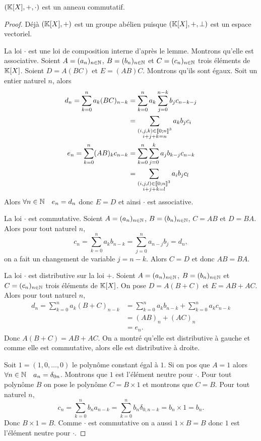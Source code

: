 \begin{theo}
  $(\mathbb{K}[X],+,\cdot)$ est un anneau commutatif.
\end{theo}
\begin{proof}
  Déjà $(\mathbb{K}[X],+)$ est un groupe abélien puisque $(\mathbb{K}[X],+,\perp)$ est un espace vectoriel.

  La loi $\cdot$ est une loi de composition interne d'après le lemme. Montrons qu'elle est associative. Soient $A=(a_n)_{n \in \mathbb{N}}$, $B=(b_n)_{n \in \mathbb{N}}$ et $C=(c_n)_{n \in \mathbb{N}}$ trois éléments de $\mathbb{K}[X]$. Soient $D=A(BC)$ et $E=(AB)C$. Montrons qu'ils sont égaux. Soit un entier naturel $n$, alors
  \begin{align}
    d_n = \sum_{k=0}^n a_k (BC)_{n-k} &= \sum_{k=0}^n a_k \sum_{j=0}^{n-k} b_j c_{n-k-j} \\
    &=\sum_{\substack{(i,j,k)\in \mathopen{\llbracket}0\mathclose{}\mathpunct{};n\mathclose{\rrbracket}^3 \\  i+j+k=n}} a_k b_j c_i \\
    e_n = \sum_{k=0}^n (AB)_k c_{n-k} &= \sum_{k=0}^n \sum_{j=0}^{k} a_j  b_{k-j} c_{n-k} \\
    &=\sum_{\substack{(i,j,l)\in \mathopen{\llbracket}0\mathclose{}\mathpunct{};n\mathclose{\rrbracket}^3 \\  i+j+k=l}} a_i b_j c_l \\
  \end{align}
  Alors $\forall n \in \mathbb{N} \quad e_n=d_n$ donc $E=D$ et ainsi $\cdot$ est associative.

  La loi $\cdot$ est commutative. Soient $A=(a_n)_{n \in \mathbb{N}}$, $B=(b_n)_{n \in \mathbb{N}}$, $C=AB$ et $D=BA$. Alors pour tout naturel $n$,
  \begin{equation}
    c_n = \sum_{k=0}^n a_k b_{n-k} = \sum_{j=0}^n a_{n-j} b_{j} =d_n,
  \end{equation}
  on a fait un changement de variable $j=n-k$. Alors $C=D$ et donc $AB=BA$.

  La loi $\cdot$ est distributive sur la loi $+$. Soient $A=(a_n)_{n \in \mathbb{N}}$, $B=(b_n)_{n \in \mathbb{N}}$ et $C=(c_n)_{n \in \mathbb{N}}$ trois éléments de $\mathbb{K}[X]$. On pose $D=A(B+C)$ et $E=AB+AC$. Alors pour tout naturel $n$,
  \begin{align}
    d_n = \sum_{k=0}^n a_k(B+C)_{n-k} &= \sum_{k=0}^n a_k b_{n-k} + \sum_{k=0}^n a_k c_{n-k} \\
    &=(AB)_n +(AC)_n \\
    &=e_n.
  \end{align}
  Donc $A(B+C)=AB+AC$. On a montré qu'elle est distributive à gauche et comme elle est commutative, alors elle est distributive à droite.

  Soit $1=(1,0, \ldots, 0)$ le polynôme constant égal à $1$. Si on pos que $A=1$ alors $\forall n \in \mathbb{N} \quad a_n = \delta_{0n}$. Montrons que $1$ est l'élément neutre pour $\cdot$. Pour tout polynôme $B$ on pose le polynôme $C=B \times 1$ et montrons que $C=B$. Pour tout naturel $n$,
  \begin{equation}
    c_n = \sum_{k=0}^n b_{n} a_{n-k} = \sum_{k=0}^n b_{n} \delta_{0,n-k} = b_n \times 1 = b_n.
  \end{equation}
  Donc $B \times 1 = B$. Comme $\cdot$ est commutative on a aussi $1 \times B=B$ donc $1$ est l'élément neutre pour $\cdot$.
\end{proof}

